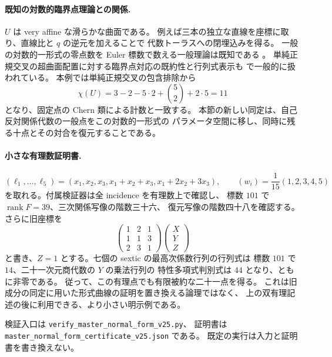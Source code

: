\paragraph{既知の対数的臨界点理論との関係.}
$U$ は very affine な滑らかな曲面である。
例えば三本の独立な直線を座標に取り、直線比と $q$ の逆元を加えることで
代数トーラスへの閉埋込みを得る。
一般の対数的一形式の零点数を Euler 標数で数える一般理論は既知である
\cite[Theorem~1]{HuhML}。
単純正規交叉の超曲面配置に対する臨界点対応の既約性と行列式表示も
\cite{KSSWLikelihood}で一般的に扱われている。
本例では単純正規交叉の包含排除から
\[
 \chi(U)=3-2-5\cdot2+\binom52+2\cdot5=11
\]
となり、固定点の Chern 類による計数と一致する。
本節の新しい同定は、自己反対関係代数の一般点をこの対数的一形式の
パラメータ空間に移し、同時に残る十点とその対合を復元することである。

\paragraph{小さな有理数証明書.}
\[
 (\ell_1,\ldots,\ell_5)=(x_1,x_2,x_3,x_1+x_2+x_3,x_1+2x_2+3x_3),
 \qquad (w_i)=\frac1{15}(1,2,3,4,5)
\]
を取れる。付属検証器は全 incidence を有理数上で確認し、
標数 $101$ で $\operatorname{rank}F=39$、三次関係写像の階数三十六、
復元写像の階数四十八を確認する。
さらに旧座標を
\[
 \begin{pmatrix}1&2&1\\1&1&3\\2&3&1\end{pmatrix}
 \begin{pmatrix}X\\Y\\Z\end{pmatrix}
\]
と書き、$Z=1$ とする。七個の sextic の最高次係数行列の行列式は
標数 $101$ で $14$、二十一次元商代数の $Y$ の乗法行列の
特性多項式判別式は $44$ となり、ともに非零である。
従って、この有理点でも有限被約な二十一点を得る。
これは旧成分の同定に用いた形式曲線の証明を置き換える論理ではなく、
上の双有理記述の後に利用できる、より小さい明示例である。

検証入口は \nolinkurl{verify_master_normal_form_v25.py}、
証明書は \nolinkurl{master_normal_form_certificate_v25.json} である。
既定の実行は入力と証明書を書き換えない。
